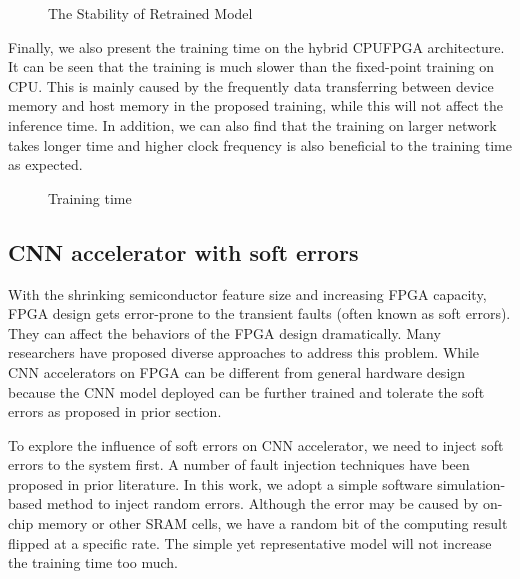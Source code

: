 \begin{figure}
        \caption{The Stability of Retrained Model}
        \label{fig:stability}
\end{figure}

  Finally, we also present the training time on the hybrid CPUFPGA architecture. 
It can be seen that the training is much slower than the fixed-point training on CPU. 
This is mainly caused by the frequently data transferring between device memory and host 
memory in the proposed training, while this will not affect the inference time. In addition, 
we can also find that the training on larger network takes longer time and higher clock frequency 
is also beneficial to the training time as expected. 

\begin{figure}
        \caption{Training time}
        \label{fig:time}
\end{figure}


\subsection{CNN accelerator with soft errors}
  With the shrinking semiconductor feature size and increasing FPGA capacity, 
FPGA design gets error-prone to the transient faults (often known as soft errors). 
They can affect the behaviors of the FPGA design dramatically. Many researchers \cite{Mansour_20,Karim_21,Nidhin_22,Subasi_23,ROSCH_24} 
have proposed diverse approaches to address this problem. While CNN accelerators on FPGA can be different 
from general hardware design because the CNN model deployed can be further trained and tolerate the 
soft errors as proposed in prior section\cite{Tu2018RANA_1}.

  To explore the influence of soft errors on CNN accelerator, we need to inject soft errors to the system first. 
A number of fault injection techniques have been proposed in prior literature. In this work, we adopt 
a simple software simulation- based method to inject random errors. Although the error may be caused by 
on-chip memory or other SRAM cells, we have a random bit of the computing result flipped at a specific rate. 
The simple yet representative model will not increase the training time too much.

